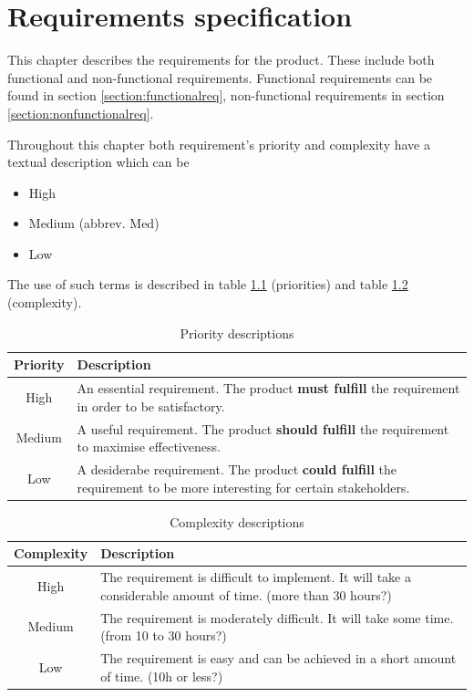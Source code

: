 \chapter{Requirements specification}

\label{ch:requirements}

This chapter describes the requirements for the product. These include both functional and non-functional requirements.
Functional requirements can be found in section \ref{section:functionalreq},
non-functional requirements in section \ref{section:nonfunctionalreq}.

Throughout this chapter both requirement's priority and complexity have a textual description which can be
\begin{itemize}
\item High
\item Medium (abbrev. Med)
\item Low
\end{itemize}

The use of such terms is described in table \ref{table:priorities} (priorities) and table \ref{table:complexity} (complexity).

\begin{table}[H]
\begin{center}
\begin{tabular}{ | c | p{12.5cm} | }
  \hline
  Priority & Description \\
  \hline\noalign{\smallskip}\noalign{\smallskip}\hline
  High & An essential requirement. The product \textbf{must fulfill} the requirement in order to be satisfactory. \\
  Medium & A useful requirement. The product \textbf{should fulfill} the requirement to maximise effectiveness. \\
  Low & A desiderabe requirement. The product \textbf{could fulfill} the requirement to be more interesting for certain stakeholders. \\
  \hline
\end{tabular}
\end{center}
\caption{Priority descriptions}
\label{table:priorities}
\end{table}

\begin{table}[H]
\begin{center}
\begin{tabular}{ | c | p{12.5cm} | }
  \hline
  Complexity & Description \\
  \hline\noalign{\smallskip}\noalign{\smallskip}\hline
  High & The requirement is difficult to implement. It will take a considerable amount of time. (more than 30 hours?) \\
  Medium & The requirement is moderately difficult. It will take some time. (from 10 to 30 hours?) \\
  Low & The requirement is easy and can be achieved in a short amount of time. (10h or less?) \\
  \hline
\end{tabular}
\end{center}
\caption{Complexity descriptions}
\label{table:complexity}
\end{table}

